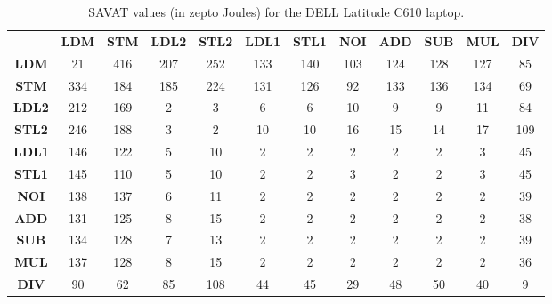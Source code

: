 \begin{table}[htb]
\scriptsize
\setlength{\tabcolsep}{2.3pt}
\setlength\extrarowheight{1pt}
\caption{SAVAT values (in zepto Joules) for the DELL Latitude C610 laptop.}
\begin{tabular}{|c||c|c|c|c|c|c|c|c|c|c|c|} \hline
& \textbf{LDM} & \textbf{STM} & \textbf{LDL2} & \textbf{STL2} & \textbf{LDL1} & \textbf{STL1} & \textbf{NOI} & \textbf{ADD} & \textbf{SUB} & \textbf{MUL} & \textbf{DIV}
\\ \hhline{|=||=|=|=|=|=|=|=|=|=|=|=|}
\textbf{LDM} &  {21} &  {416} &  {207} &  {252} &  {133} &  {140} &  {103} &  {124} &  {128} &  {127} &  {85} \\ \hline
\textbf{STM} &  {334} &  {184} &  {185} &  {224} &  {131} &  {126} &  {92} &  {133} &  {136} &  {134} &  {69} \\ \hline
\textbf{LDL2} &  {212} &  {169} &  {2} &  {3} &  {6} &  {6} &  {10} &  {9} &  {9} &  {11} &  {84} \\ \hline
\textbf{STL2} &  {246} &  {188} &  {3} &  {2} &  {10} &  {10} &  {16} &  {15} &  {14} &  {17} &  {109} \\ \hline
\textbf{LDL1} &  {146} &  {122} &  {5} &  {10} &  {2} &  {2} &  {2} &  {2} &  {2} &  {3} &  {45} \\ \hline
\textbf{STL1} &  {145} &  {110} &  {5} &  {10} &  {2} &  {2} &  {3} &  {2} &  {2} &  {3} &  {45} \\ \hline
\textbf{NOI} &  {138} &  {137} &  {6} &  {11} &  {2} &  {2} &  {2} &  {2} &  {2} &  {2} &  {39} \\ \hline
\textbf{ADD} &  {131} &  {125} &  {8} &  {15} &  {2} &  {2} &  {2} &  {2} &  {2} &  {2} &  {38} \\ \hline
\textbf{SUB} &  {134} &  {128} &  {7} &  {13} &  {2} &  {2} &  {2} &  {2} &  {2} &  {2} &  {39} \\ \hline
\textbf{MUL} &  {137} &  {128} &  {8} &  {15} &  {2} &  {2} &  {2} &  {2} &  {2} &  {2} &  {36} \\ \hline
\textbf{DIV} &  {90} &  {62} &  {85} &  {108} &  {44} &  {45} &  {29} &  {48} &  {50} &  {40} &  {9} \\ \hline
\end{tabular}
\label{fig:savat-20cm-p3}
\end{table}

